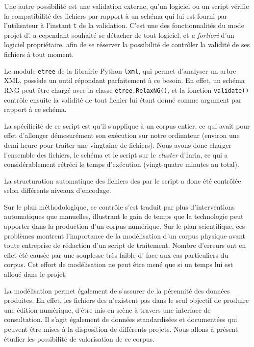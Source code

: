 Une autre possibilité est une validation externe, \cad{} qu'un logiciel ou un script vérifie la compatibilité des fichiers par rapport à un schéma qui lui est fourni par l'utilisateur à l'instant \texttt{t} de la validation. C'est une des fonctionnalités du mode \og projet \fg{} d'\oxygen. \timeus{} a cependant souhaité se détacher de tout logiciel, et \textit{a fortiori} d'un logiciel propriétaire, afin de se réserver la possibilité de contrôler la validité de ses fichiers à tout moment.

Le module \texttt{etree} de la librairie Python \texttt{lxml}, qui permet d'analyser un arbre XML, possède un outil répondant parfaitement à ce besoin. En effet, un schéma RNG peut être chargé avec la classe \texttt{etree.RelaxNG()}, et la fonction \texttt{validate()} contrôle ensuite la validité de tout fichier lui étant donné comme argument par rapport à ce schéma.

La spécificité de ce script est qu'il s'applique à un corpus entier, ce qui avait pour effet d'allonger démesurément son exécution sur notre ordinateur (environ une demi-heure pour traiter une vingtaine de fichiers). Nous avons donc charger l'ensemble des fichiers, le schéma et le script sur le \textit{cluster} \rioc{} d'Inria, ce qui a considérablement rétréci le temps d'exécution  (vingt-quatre minutes au total).

\clearpage


La structuration automatique des fichiers des \odm{} par le script \lse{} a donc été contrôlée selon différents niveaux d'encodage.

Sur le plan méthodologique, ce contrôle s'est traduit par plus d'interventions automatiques que manuelles, illustrant le gain de temps que la technologie peut apporter dans la production d'un corpus numérique. Sur le plan scientifique, ces problèmes montrent l'importance de la modélisation d'un corpus physique avant toute entreprise de rédaction d'un script de traitement. Nombre d'erreurs ont en effet été causée par une souplesse très faible d'\lse{} face aux cas particuliers du corpus. Cet effort de modélisation ne peut être mené que si un temps lui est alloué dans le projet.

La modélisation permet également de s'assurer de la pérennité des données produites. En effet, les fichiers des \odm{} n'existent pas dans le seul objectif de produire une édition numérique, \cad{} d'être mis en scène à travers une interface de consultation. Il s'agit également de données standardisées et documentées qui peuvent être mises à la disposition de différents projets. Nous allons à présent étudier les possibilité de valorisation de ce corpus.

